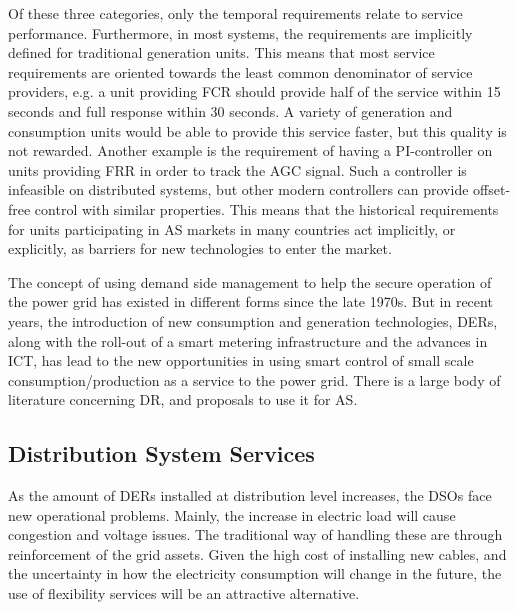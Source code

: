 Of these three categories, only the temporal requirements relate to service performance. Furthermore, in most systems, the requirements are implicitly defined for traditional generation units. This means that most service requirements are oriented towards the least common denominator of service providers, e.g. a unit providing FCR should provide half of the service within 15 seconds and full response within 30 seconds. A variety of generation and consumption units would be able to provide this service faster, but this quality is not rewarded. Another example is the requirement of having a PI-controller on units providing FRR in order to track the AGC signal. Such a controller is infeasible on distributed systems, but other modern controllers can provide offset-free control with similar properties. This means that the historical requirements for units participating in AS markets in many countries act implicitly, or explicitly, as barriers for new technologies to enter the market.%

The concept of using demand side management to help the secure operation of the power grid has existed in different forms since the late 1970s. But in recent years, the introduction of new consumption and generation technologies, \ie DERs, along with the roll-out of a smart metering infrastructure and the advances in ICT, has lead to the new opportunities in using smart control of small scale consumption/production as a service to the power grid. There is a large body of literature concerning DR, and proposals to use it for AS.%
\subsection{Distribution System Services} %
\label{sub:dsoservices}
As the amount of DERs installed at distribution level increases, the DSOs face new operational problems. Mainly, the increase in electric load will cause congestion and voltage issues. The traditional way of handling these are through reinforcement of the grid assets. Given the high cost of installing new cables, and the uncertainty in how the electricity consumption will change in the future, the use of flexibility services will be an attractive alternative.

